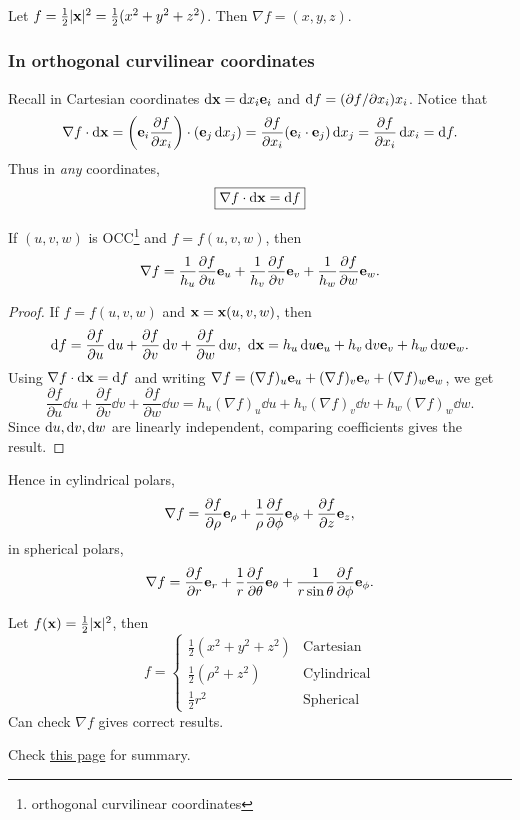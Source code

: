 \begin{example}
    Let $ f=\frac{1}{2}|{\bf x}|^2 = \frac{1}{2}(x^2+y^2+z^2) $. Then $ \nabla f = (x,y,z) $.
\end{example}

\subsubsection{In orthogonal curvilinear coordinates}
Recall in Cartesian coordinates $ \mathrm{d} {\bf x} = \mathrm{d} x_i {\bf e}_i $ and $ \mathrm{d} f = (\partial f/\partial x_i ) x_i $. Notice that
\[
    \nabla f \cdot \mathrm{d} {\bf x} = \left( {\bf e}_i \frac{\partial f}{\partial x_i}  \right) \cdot \left( {\bf e}_j \,\mathrm{d} x_j \right) = \frac{\partial f}{\partial x_i}({\bf e}_i\cdot {\bf e}_j) \,\mathrm{d} x_j = \frac{\partial f}{\partial x_i}\,\mathrm{d} x_i = \mathrm{d} f.  
\]
Thus in \textit{any} coordinates, 
\[
    \boxed{\nabla f\cdot \mathrm{d} {\bf x} = \mathrm{d} f}
\] 

\begin{proposition}\label{prop:2.1}
    If $ (u,v,w) $ is OCC\footnote{orthogonal curvilinear coordinates} and $f=f(u,v,w)$, then 
    \[
        \nabla f = \frac{1}{h_u}\frac{\partial f}{\partial u}{\bf e}_u + \frac{1}{h_v}\frac{\partial f}{\partial v}{\bf e}_v + \frac{1}{h_w}\frac{\partial f}{\partial w}{\bf e}_w.
    \] 
\end{proposition}
\begin{proof}
    If $ f=f(u,v,w) $ and $ {\bf x} = {\bf x}(u,v,w) $, then 
    \[
        \mathrm{d} f = \frac{\partial f}{\partial u}\,\mathrm{d} u +\frac{\partial f}{\partial v}\,\mathrm{d} v +\frac{\partial f}{\partial w}\,\mathrm{d} w,\ \mathrm{d} {\bf x} = h_u\,\mathrm{d} u{\bf e}_u+h_v\,\mathrm{d} v{\bf e}_v+h_w\,\mathrm{d} w{\bf e}_w.
    \]
    Using $\nabla f\cdot \mathrm{d} {\bf x} = \mathrm{d} f$ and writing $ \nabla f = (\nabla f)_u{\bf e}_u+(\nabla f)_v{\bf e}_v+(\nabla f)_w{\bf e}_w $, we get 
    \[
        \frac{\partial f}{\partial u}\dd u +\frac{\partial f}{\partial v}\dd v +\frac{\partial f}{\partial w}\dd w = h_u(\nabla f)_u \dd u+h_v(\nabla f)_v \dd v+h_w(\nabla f)_w \dd w.
    \]
    Since $ \mathrm{d} u, \mathrm{d} v,\mathrm{d} w $ are linearly independent, comparing coefficients gives the result.
\end{proof}

Hence in cylindrical polars,
\[
    \nabla f = \frac{\partial f}{\partial \rho}{\bf e}_\rho+\frac{1}{\rho} \frac{\partial f}{\partial \phi}{\bf e}_\phi+\frac{\partial f}{\partial z}{\bf e}_z,  
\]
in spherical polars,
\[
    \nabla f = \frac{\partial f}{\partial r}{\bf e}_r+\frac{1}{r}\frac{\partial f}{\partial \theta}{\bf e}_\theta+\frac{1}{r\sin\theta}\frac{\partial f}{\partial \phi}{\bf e}_\phi.   
\]
\begin{example}
    Let $ f({\bf x})= \frac{1}{2}|{\bf x}|^2 $, then 
    \[
        f = \begin{cases}
        \frac{1}{2}(x^2+y^2+z^2) &\text{Cartesian}\\
        \frac{1}{2}(\rho^2+z^2) &\text{Cylindrical}\\
        \frac{1}{2}r^2 &\text{Spherical}
        \end{cases} 
    \]
    Can check $ \nabla f $ gives correct results.
\end{example}
Check \href{https://www.vle.cam.ac.uk/pluginfile.php/19798882/mod_resource/content/2/vc_notes1.pdf#page=17}{this page} for summary.